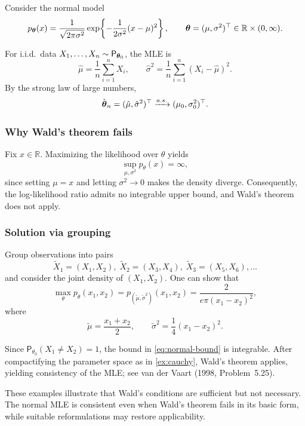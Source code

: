\begin{ex}
\label{ex:normal}

Consider the normal model
\begin{equation*}
p_{\boldsymbol{\theta}}(x)
=
\frac{1}{\sqrt{2\pi\sigma^2}}
\exp\!\left\{-\frac{1}{2\sigma^2}(x-\mu)^2\right\},
\qquad
\boldsymbol{\theta}=(\mu,\sigma^2)^{\top}\in\mathbb{R}\times(0,\infty).
\end{equation*}

For i.i.d.\ data $X_1,\dots,X_n\sim\mathsf{P}_{\boldsymbol{\theta}_0}$, the MLE is
\begin{equation*}
\hat{\mu}
=
\frac{1}{n}\sum_{i=1}^n X_i,
\qquad
\hat{\sigma}^2
=
\frac{1}{n}\sum_{i=1}^n (X_i-\hat{\mu})^2.
\end{equation*}
By the strong law of large numbers,
\begin{equation*}
\hat{\boldsymbol{\theta}}_n
=
(\hat{\mu},\hat{\sigma}^2)^{\top}
\xrightarrow{a.s.}
(\mu_0,\sigma_0^2)^{\top}.
\end{equation*}

\subsubsection*{Why Wald's theorem fails}

Fix $x\in\mathbb{R}$. Maximizing the likelihood over $\theta$ yields
\begin{equation*}
\sup_{\mu,\sigma^2} p_\theta(x)
=
\infty,
\end{equation*}
since setting $\mu=x$ and letting $\sigma^2\to 0$ makes the density diverge. Consequently, the log-likelihood ratio admits no integrable upper bound, and Wald's theorem does not apply.

\subsubsection*{Solution via grouping}

Group observations into pairs
\begin{equation*}
\tilde{X}_1=(X_1,X_2),\;
\tilde{X}_2=(X_3,X_4),\;
\tilde{X}_3=(X_5,X_6),\dots
\end{equation*}
and consider the joint density of $(X_1,X_2)$. One can show that
\begin{equation}
\max_{\theta} p_\theta(x_1,x_2)
=
p_{(\tilde{\mu},\tilde{\sigma}^2)}(x_1,x_2)
=
\frac{2}{e\pi(x_1-x_2)^2},
\label{eq:normal-bound}
\end{equation}
where
\begin{equation*}
\tilde{\mu}=\frac{x_1+x_2}{2},
\qquad
\tilde{\sigma}^2=\frac{1}{4}(x_1-x_2)^2.
\end{equation*}

Since $\mathsf{P}_{\theta_0}(X_1\neq X_2)=1$, the bound in \eqref{eq:normal-bound} is integrable. After compactifying the parameter space as in \autoref{ex:cauchy}, Wald's theorem applies, yielding consistency of the MLE; see van der Vaart (1998, Problem~5.25).
\end{ex}

\begin{remark}
These examples illustrate that Wald's conditions are sufficient but not necessary. The normal MLE is consistent even when Wald's theorem fails in its basic form, while suitable reformulations may restore applicability.
\end{remark}
